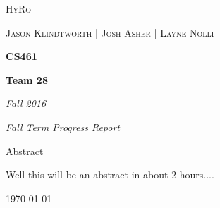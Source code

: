 \documentclass[10pt,draftclsnofoot,onecolumn]{IEEEtran}
\begin{document}
\begin{titlepage}
	\centering
	{\scshape\LARGE HyRo \par}
	\vspace{1cm}
	{\scshape\Large Jason Klindtworth  |  Josh Asher  |   Layne Nolli\par}
	\vspace{1.5cm}
	{\huge\bfseries CS461\par}
	\vspace{2cm}
	{\huge\bfseries Team 28\par}
	\vspace{2cm}
	{\Large\itshape Fall 2016\par}
	\vspace{4cm}
	{\Large\itshape Fall Term Progress Report\par}
	\vspace{4cm}
	{\large Abstract\par}
	\vspace{1cm}
	Well this will be an abstract in about 2 hours.... \par

	\vfill

	{\large \today\par}
\end{titlepage}
\end{document}
